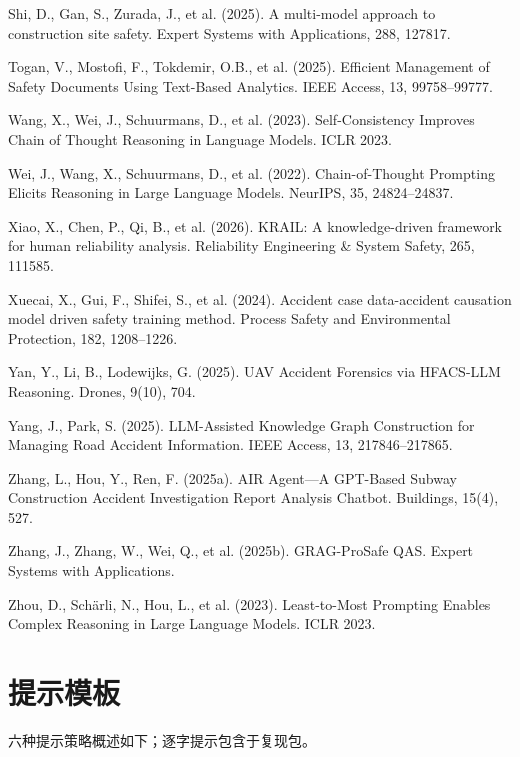 \documentclass[11pt]{article}
\begin{document}
Shi, D., Gan, S., Zurada, J., et al. (2025). A multi-model approach to construction site safety. Expert Systems with Applications, 288, 127817.

Togan, V., Mostofi, F., Tokdemir, O.B., et al. (2025). Efficient Management of Safety Documents Using Text-Based Analytics. IEEE Access, 13, 99758--99777.

Wang, X., Wei, J., Schuurmans, D., et al. (2023). Self-Consistency Improves Chain of Thought Reasoning in Language Models. ICLR 2023.

Wei, J., Wang, X., Schuurmans, D., et al. (2022). Chain-of-Thought Prompting Elicits Reasoning in Large Language Models. NeurIPS, 35, 24824--24837.

Xiao, X., Chen, P., Qi, B., et al. (2026). KRAIL: A knowledge-driven framework for human reliability analysis. Reliability Engineering \& System Safety, 265, 111585.

Xuecai, X., Gui, F., Shifei, S., et al. (2024). Accident case data-accident causation model driven safety training method. Process Safety and Environmental Protection, 182, 1208--1226.

Yan, Y., Li, B., Lodewijks, G. (2025). UAV Accident Forensics via HFACS-LLM Reasoning. Drones, 9(10), 704.

Yang, J., Park, S. (2025). LLM-Assisted Knowledge Graph Construction for Managing Road Accident Information. IEEE Access, 13, 217846--217865.

Zhang, L., Hou, Y., Ren, F. (2025a). AIR Agent---A GPT-Based Subway Construction Accident Investigation Report Analysis Chatbot. Buildings, 15(4), 527.

Zhang, J., Zhang, W., Wei, Q., et al. (2025b). GRAG-ProSafe QAS. Expert Systems with Applications.

Zhou, D., Schärli, N., Hou, L., et al. (2023). Least-to-Most Prompting Enables Complex Reasoning in Large Language Models. ICLR 2023.

\appendix
\section*{{\cjkfont 提\allowbreak 示\allowbreak 模\allowbreak 板}}
{\cjkfont 六\allowbreak 种\allowbreak 提\allowbreak 示\allowbreak 策\allowbreak 略\allowbreak 概\allowbreak 述\allowbreak 如\allowbreak 下\allowbreak ；\allowbreak 逐\allowbreak 字\allowbreak 提\allowbreak 示\allowbreak 包\allowbreak 含\allowbreak 于\allowbreak 复\allowbreak 现\allowbreak 包\allowbreak 。}
\end{document}
